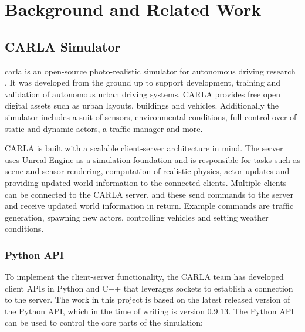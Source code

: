 \chapter{Background and Related Work}
\label{chap:background}


\section{CARLA Simulator}
\acrfull{carla} is an open-source photo-realistic simulator for autonomous driving research \cite{introducing-carla-paper}. It was developed from the ground up to support development, training and validation of autonomous urban driving systems. CARLA provides free open digital assets such as urban layouts, buildings and vehicles. Additionally the simulator includes a suit of sensors, environmental conditions, full control over of static and dynamic actors, a traffic manager and more.

CARLA is built with a scalable client-server architecture in mind. The server uses Unreal Engine \cite{unrealengine} as a simulation foundation and is responsible for tasks such as scene and sensor rendering, computation of realistic physics, actor updates and providing updated world information to the connected clients. Multiple clients can be connected to the CARLA server, and these send commands to the server and receive updated world information in return. Example commands are traffic generation, spawning new actors, controlling vehicles and setting weather conditions.

\subsection{Python API}
To implement the client-server functionality, the CARLA team has developed client APIs in Python \cite{carla-python-api} and C++ \cite{carla-cplusplus-api} that leverages sockets to establish a connection to the server. The work in this project is based on the latest released version of the Python API, which in the time of writing is version 0.9.13. The Python API can be used to control the core parts of the simulation: 

